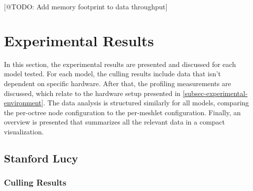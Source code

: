 [@TODO: Add memory footprint to data throughput]


\section{Experimental Results}

In this section, the experimental results are presented and discussed for each model tested.
For each model, the culling results include data that isn't dependent on specific hardware. 
After that, the profiling measurements are discussed, which relate to the hardware setup presented 
in \ref{subsec-experimental-environment}. The data analysis is structured similarly for all models,
comparing the per-octree node configuration to the per-meshlet configuration. Finally, an overview 
is presented that summarizes all the relevant data in a compact visualization.


\subsection*{Stanford Lucy}

\subsubsection*{Culling Results} \label{subsubsec-culling-results-lucy}


